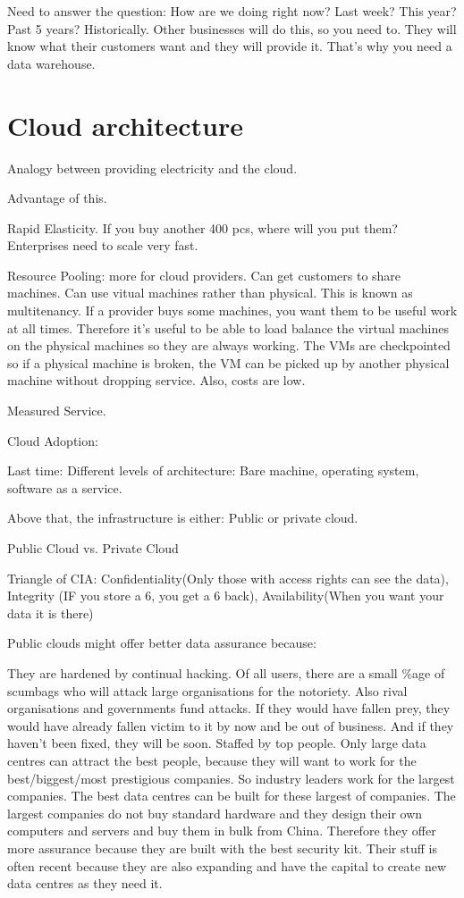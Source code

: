 \documentclass[11pt]{article}
\begin{document}
Need to answer the question: How are we doing right now? Last week? This year? Past 5 years? Historically. Other businesses will do this, so you need to. They will know what their customers want and they will provide it. That’s why you need a data warehouse.

\section{Cloud architecture}

Analogy between providing electricity and the cloud.

Advantage of this.

Rapid Elasticity. If you buy another 400 pcs, where will you put them? Enterprises need to scale very fast.

Resource Pooling: more for cloud providers. Can get customers to share machines. Can use vitual machines rather than physical. This is known as multitenancy. If a provider buys some machines, you want them to be useful work at all times. Therefore it’s useful to be able to load balance the virtual machines on the physical machines so they are always working. The VMs are checkpointed so if a physical machine is broken, the VM can be picked up by another physical machine without dropping service. Also, costs are low.

Measured Service.

Cloud Adoption:

Last time: Different levels of architecture: Bare machine, operating system, software as a service.

Above that, the infrastructure is either: Public or private cloud.

Public Cloud vs. Private Cloud

Triangle of CIA: Confidentiality(Only those with access rights can see the data), Integrity (IF you store a 6, you get a 6 back), Availability(When you want your data it is there)

Public clouds might offer better data assurance because:

They are hardened by continual hacking. Of all users, there are a small \%age of scumbags who will attack large organisations for the notoriety. Also rival organisations and governments fund attacks. If they would have fallen prey, they would have already fallen victim to it by now and be out of business. And if they haven’t been fixed, they will be soon.
Staffed by top people. Only large data centres can attract the best people, because they will want to work for the best/biggest/most prestigious companies. So industry leaders work for the largest companies.
The best data centres can be built for these largest of companies. The largest companies do not buy standard hardware and they design their own computers and servers and buy them in bulk from China. Therefore they offer more assurance because they are built with the best security kit. Their stuff is often recent because they are also expanding and have the capital to create new data centres as they need it.
\end{document}
